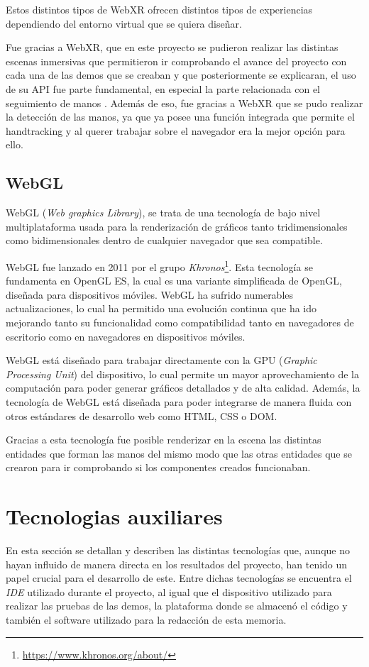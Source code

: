 \documentclass[a4paper, 12pt]{book}
\begin{document}
Estos distintos tipos de WebXR ofrecen distintos tipos de experiencias dependiendo del entorno virtual que se quiera diseñar.

Fue gracias a WebXR, que en este proyecto se pudieron realizar las distintas escenas inmersivas que permitieron ir comprobando el avance del proyecto con cada una de las demos que se creaban y que posteriormente se explicaran, el uso de su API \cite{w3c2024} fue parte fundamental, en especial la parte relacionada con el seguimiento de manos \cite{w3cHandInput2024}. Además de eso, fue gracias a WebXR que se pudo realizar la detección de las manos, ya que ya posee una función integrada que permite el handtracking y al querer trabajar sobre el navegador era la mejor opción para ello. 

\subsection{WebGL}
\label{subsec:WebGL}
WebGL \cite{webgl_encodebiz} \cite{matsuda2013} (\textit{Web graphics Library}), se trata de una tecnología de bajo nivel multiplataforma usada para la renderización de gráficos tanto tridimensionales como bidimensionales dentro de cualquier navegador que sea compatible.

WebGL fue lanzado en 2011 por el grupo \textit{Khronos}\footnote{\url{https://www.khronos.org/about/}}. Esta tecnología se fundamenta en OpenGL ES, la cual es una variante simplificada de OpenGL, diseñada para dispositivos móviles. WebGL ha sufrido numerables actualizaciones, 
lo cual ha permitido una evolución continua que ha ido mejorando tanto su funcionalidad como compatibilidad tanto en navegadores de escritorio como en navegadores en dispositivos móviles. 

WebGL está diseñado para trabajar directamente con la GPU (\textit{Graphic Processing Unit}) del dispositivo, lo cual permite un mayor aprovechamiento de la computación para poder generar gráficos detallados y de alta calidad. 
Además, la tecnología de WebGL está diseñada para poder integrarse de manera fluida con otros estándares de desarrollo web como HTML, CSS o DOM. 

Gracias a esta tecnología fue posible renderizar en la escena las distintas entidades que forman las manos del mismo modo que las otras entidades que se crearon para ir comprobando si los componentes creados funcionaban.

\section{Tecnologias auxiliares}
\label{sec:tecnologias-auxiliares}
En esta sección se detallan y describen las distintas tecnologías que, aunque no hayan influido de manera directa en los resultados del proyecto, han tenido un papel crucial para el desarrollo de este.
Entre dichas tecnologías se encuentra el \textit{IDE} utilizado durante el proyecto, al igual que el dispositivo utilizado para realizar las pruebas de las demos, la plataforma donde se almacenó el código y también el software utilizado para la redacción de esta memoria.
\end{document}
